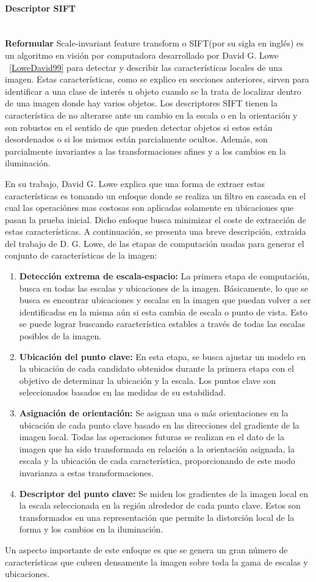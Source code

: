 \paragraph{Descriptor SIFT} ~\\
	\textbf{Reformular}
	Scale-invariant feature transform o SIFT(por su sigla en inglés) es un algoritmo en visión por computadora desarrollado por David G. Lowe ~\ref{LoweDavid99} para detectar y describir las características locales de una imagen. Estas características, como se explico en secciones anteriores, sirven para identificar a una clase de interés u objeto cuando se la trata de localizar dentro de una imagen donde hay varios objetos. Los descriptores SIFT tienen la característica de no alterarse ante un cambio en la escala o en la orientación y son robustos en el sentido de que pueden detectar objetos si estos están desordenados o si los mismos están parcialmente ocultos. Además, son parcialmente invariantes a las transformaciones afines y a los cambios en la iluminación.
	
	En su trabajo, David G. Lowe explica que una forma de extraer estas características es tomando un enfoque donde se realiza un filtro en cascada en el cual las operaciónes mas costosas son aplicadas solamente en ubicaciones que pasan la prueba inicial. Dicho enfoque busca minimizar el coste de extracción de estas características. A continuación, se presenta una breve descripción, extraida del trabajo de D. G. Lowe, de las etapas de computación usadas para generar el conjunto de características de la imagen:
	\begin{enumerate}
		\item \textbf{Detección extrema de escala-espacio:} La primera etapa de computación, busca en todas las escalas y ubicaciones de la imagen. Básicamente, lo que se busca es encontrar ubicaciones y escalas en la imagen que puedan volver a ser identificadas en la misma aún si esta cambia de escala o punto de vista. Esto se puede lograr buscando característica estables a través de todas las escalas posibles de la imagen.
		\item \textbf{Ubicación del punto clave:} En esta etapa, se busca ajustar un modelo en la ubicación de cada candidato obtenidos durante la primera etapa con el objetivo de determinar la ubicación y la escala. Los puntos clave son seleccionados basados en las medidas de su estabilidad.
		\item \textbf{Asignación de orientación:} Se asignan una o más orientaciones en la ubicación de cada punto clave basado en las direcciones del gradiente de la imagen local. Todas las operaciones futuras se realizan en el dato de la imagen que ha sido transformada en relación a la orientación asignada, la escala y la ubicación de cada característica, proporcionando de este modo invarianza a estas transformaciones.
		\item \textbf{Descriptor del punto clave:} Se miden los gradientes de la imagen local en la escala seleccionada en la región alrededor de cada punto clave. Estos son transformados en una representación que permite la distorción local de la forma y los cambios en la iluminación.
	\end{enumerate}
	
	Un aspecto importante de este enfoque es que se genera un gran número de características que cubren densamente la imagen sobre toda la gama de escalas y ubicaciones.
